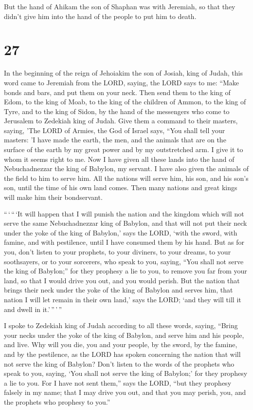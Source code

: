  But the hand of Ahikam the son of Shaphan was with
Jeremiah, so that they didn't give him into the hand of the people to
put him to death.

\hypertarget{section-26}{%
\section{27}\label{section-26}}

 In the beginning of the reign of Jehoiakim the son of
Josiah, king of Judah, this word came to Jeremiah from the LORD, saying,
 the LORD says to me: ``Make bonds and bars, and put them on
your neck.  Then send them to the king of Edom, to the king
of Moab, to the king of the children of Ammon, to the king of Tyre, and
to the king of Sidon, by the hand of the messengers who come to
Jerusalem to Zedekiah king of Judah.  Give them a command to
their masters, saying, 'The LORD of Armies, the God of Israel says,
``You shall tell your masters:  'I have made the earth, the
men, and the animals that are on the surface of the earth by my great
power and by my outstretched arm. I give it to whom it seems right to
me.  Now I have given all these lands into the hand of
Nebuchadnezzar the king of Babylon, my servant. I have also given the
animals of the field to him to serve him.  All the nations
will serve him, his son, and his son's son, until the time of his own
land comes. Then many nations and great kings will make him their
bondservant.

 ``\,`\,``\,`It will happen that I will punish the nation
and the kingdom which will not serve the same Nebuchadnezzar king of
Babylon, and that will not put their neck under the yoke of the king of
Babylon,' says the LORD, `with the sword, with famine, and with
pestilence, until I have consumed them by his hand.  But as
for you, don't listen to your prophets, to your diviners, to your
dreams, to your soothsayers, or to your sorcerers, who speak to you,
saying, ``You shall not serve the king of Babylon;''  for
they prophesy a lie to you, to remove you far from your land, so that I
would drive you out, and you would perish.  But the nation
that brings their neck under the yoke of the king of Babylon and serves
him, that nation I will let remain in their own land,' says the LORD;
`and they will till it and dwell in it.'\,''\,'\,''

 I spoke to Zedekiah king of Judah according to all these
words, saying, ``Bring your necks under the yoke of the king of Babylon,
and serve him and his people, and live.  Why will you die,
you and your people, by the sword, by the famine, and by the pestilence,
as the LORD has spoken concerning the nation that will not serve the
king of Babylon?  Don't listen to the words of the prophets
who speak to you, saying, `You shall not serve the king of Babylon;' for
they prophesy a lie to you.  For I have not sent them,''
says the LORD, ``but they prophesy falsely in my name; that I may drive
you out, and that you may perish, you, and the prophets who prophesy to
you.''

